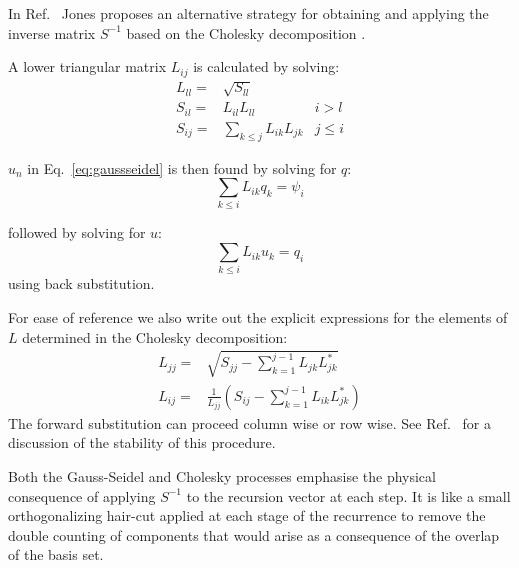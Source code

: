 In Ref.~\cite{weaire85} Jones proposes an alternative strategy
for obtaining and applying the inverse matrix $S^{-1}$ based on the Cholesky
decomposition .

A lower triangular matrix $L_{ij}$ is calculated by solving:
%
\begin{align}
\label{alg:cholesky}
L_{ll} = & \sqrt{S_{ll}}   &\\
S_{il} = & L_{il}L_{ll}    & i>l\\
S_{ij} = & \sum_{k \leq j}L_{ik}L_{jk} & j\leq i
\end{align}

$u_{n}$ in Eq.~\ref{eq:gaussseidel} is then found by solving for $q$:
%
\begin{equation}
\sum_{k\leq i} L_{ik}q_{k} = \psi_{i}
\end{equation}
%

followed by solving for $u$:
%
\begin{equation}
\sum_{k\leq i} L_{ik}u_{k} = q_{i}
\end{equation}
%
using back substitution. 

For ease of reference we also write out the explicit expressions 
for the elements of $L$ determined in the Cholesky decomposition:
%
\begin{align}
L_{jj} =& \sqrt{S_{jj} - \sum_{k=1}^{j-1}L_{jk}L^{*}_{jk}}\\
L_{ij} =& \frac{1}{L_{jj}}(S_{ij}-\sum_{k=1}^{j-1}L_{ik}L^{*}_{jk})
\end{align}
%
The forward substitution can proceed column wise or row wise. 
See Ref.~\cite{wilkinson68} for a discussion of the stability 
of this procedure.

Both the Gauss-Seidel and Cholesky processes emphasise the physical consequence
of applying $S^{-1}$ to the recursion vector at each step.
It is like a small orthogonalizing hair-cut applied at each stage of the recurrence
to remove the double counting of components that would arise 
as a consequence of the overlap of the basis set. 

